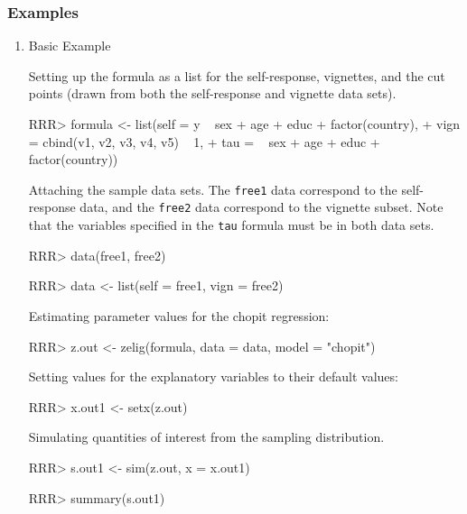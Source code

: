 \subsubsection{Examples}
\begin{enumerate}
\item {Basic Example}

Setting up the formula as a list for the self-response, vignettes, and
the cut points (drawn from both the self-response and vignette data sets).
\begin{Schunk}
\begin{Sinput}
RRR> formula <- list(self = y ~ sex + age + educ + factor(country),
+                 vign = cbind(v1, v2, v3, v4, v5) ~ 1,
+                 tau  = ~ sex + age + educ + factor(country))
\end{Sinput}
\end{Schunk}
Attaching the sample data sets.  The {\tt free1} data correspond to
the self-response data, and the {\tt free2} data correspond to the
vignette subset.  Note that the variables specified in the {\tt tau}
formula must be in both data sets.
\begin{Schunk}
\begin{Sinput}
RRR> data(free1, free2)
\end{Sinput}
\end{Schunk}
\begin{Schunk}
\begin{Sinput}
RRR> data <- list(self = free1, vign = free2)
\end{Sinput}
\end{Schunk}
Estimating parameter values for the {\sc chopit} regression:
\begin{Schunk}
\begin{Sinput}
RRR>  z.out <- zelig(formula,  data = data, model = "chopit") 
\end{Sinput}
\end{Schunk}
Setting values for the explanatory variables to their default values:
\begin{Schunk}
\begin{Sinput}
RRR>  x.out1 <- setx(z.out)
\end{Sinput}
\end{Schunk}
Simulating quantities of interest from the sampling distribution.
\begin{Schunk}
\begin{Sinput}
RRR>  s.out1 <- sim(z.out, x = x.out1)
\end{Sinput}
\end{Schunk}
\begin{Schunk}
\begin{Sinput}
RRR>  summary(s.out1)
\end{Sinput}
\end{Schunk}


\end{enumerate}
